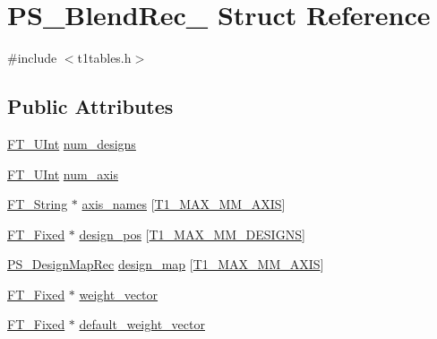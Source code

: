 \hypertarget{struct_p_s___blend_rec__}{\section{P\-S\-\_\-\-Blend\-Rec\-\_\- Struct Reference}
\label{struct_p_s___blend_rec__}
}


{\ttfamily \#include $<$t1tables.\-h$>$}

\subsection*{Public Attributes}
\begin{DoxyCompactItemize}
\item 
\hyperlink{fttypes_8h_abcb8db4dbf35d2b55a9e8c7b0926dc52}{F\-T\-\_\-\-U\-Int} \hyperlink{struct_p_s___blend_rec___ad81cbf3697f89908e9c15071e2ab9cac}{num\-\_\-designs}
\item 
\hyperlink{fttypes_8h_abcb8db4dbf35d2b55a9e8c7b0926dc52}{F\-T\-\_\-\-U\-Int} \hyperlink{struct_p_s___blend_rec___af9b375493ee2d450cabbc571473e4006}{num\-\_\-axis}
\item 
\hyperlink{fttypes_8h_a9846214585359eb2ba6bbb0e6de30639}{F\-T\-\_\-\-String} $\ast$ \hyperlink{struct_p_s___blend_rec___afc0e4018ff3439f306d61e3c219b91f9}{axis\-\_\-names} \mbox{[}\hyperlink{t1tables_8h_a471108ae668a65363dd36bb17e1ecbbe}{T1\-\_\-\-M\-A\-X\-\_\-\-M\-M\-\_\-\-A\-X\-I\-S}\mbox{]}
\item 
\hyperlink{fttypes_8h_a5f5a679cc09f758efdd0d1c5feed3c3d}{F\-T\-\_\-\-Fixed} $\ast$ \hyperlink{struct_p_s___blend_rec___ad0e6c9b9d42346fd8a3371a5b2473e3c}{design\-\_\-pos} \mbox{[}\hyperlink{t1tables_8h_a933ca229674aa312fd5546fadc95e08f}{T1\-\_\-\-M\-A\-X\-\_\-\-M\-M\-\_\-\-D\-E\-S\-I\-G\-N\-S}\mbox{]}
\item 
\hyperlink{t1tables_8h_a94de6b0634fcae90953c7427cdb28eee}{P\-S\-\_\-\-Design\-Map\-Rec} \hyperlink{struct_p_s___blend_rec___a005c783c65e5dd35611e88901b5db2ca}{design\-\_\-map} \mbox{[}\hyperlink{t1tables_8h_a471108ae668a65363dd36bb17e1ecbbe}{T1\-\_\-\-M\-A\-X\-\_\-\-M\-M\-\_\-\-A\-X\-I\-S}\mbox{]}
\item 
\hyperlink{fttypes_8h_a5f5a679cc09f758efdd0d1c5feed3c3d}{F\-T\-\_\-\-Fixed} $\ast$ \hyperlink{struct_p_s___blend_rec___ae3dcbb2aaee676fdc3d5bde890b2cc78}{weight\-\_\-vector}
\item 
\hyperlink{fttypes_8h_a5f5a679cc09f758efdd0d1c5feed3c3d}{F\-T\-\_\-\-Fixed} $\ast$ \hyperlink{struct_p_s___blend_rec___a29c19d988e8ee1eb4f333b1ac55759de}{default\-\_\-weight\-\_\-vector}

\end{DoxyCompactItemize}
